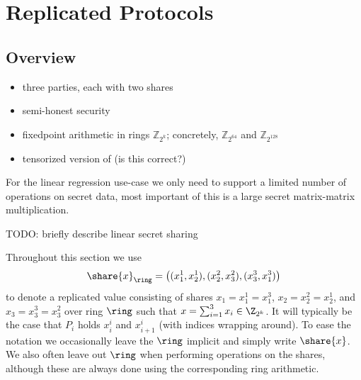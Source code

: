 \section{Replicated Protocols}


\subsection{Overview}

\begin{itemize}
    \item three parties, each with two shares
    \item semi-honest security
    \item fixedpoint arithmetic in rings $\mathbb{Z}_{2^{k}}$; concretely, $\mathbb{Z}_{2^{64}}$ and $\mathbb{Z}_{2^{128}}$
    \item tensorized version of \cite{CCS:AFLNO16} (is this correct?)
\end{itemize}

For the linear regression use-case we only need to support a limited number of
operations on secret data, most important of this is a large secret matrix-matrix
multiplication.

TODO: briefly describe linear secret sharing

Throughout this section we use 
$$
\share{x}_\ring = \left( (x_1^1, x_2^1), (x_2^2, x_3^2), (x_3^3, x_1^3) \right)
$$ to denote a replicated value consisting of shares $x_1 = x_1^1 = x_1^3$, $x_2 = x_2^2 = x_2^1$, and $x_3 = x_3^3 = x_3^2$ over ring $\ring$ such that $x = \sum_{i=1}^3 x_i \in \Z_{2^k}$. It will typically be the case that $P_i$ holds $x_i^i$ and $x_{i+1}^i$ (with indices wrapping around). To ease the notation we occasionally leave the $\ring$ implicit and simply write $\share{x}$. We also often leave out $\ring$ when performing operations on the shares, although these are always done using the corresponding ring arithmetic.











